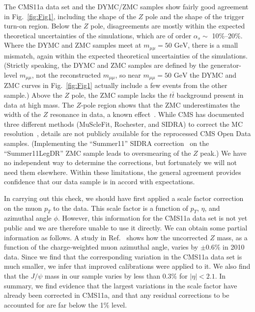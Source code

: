 \documentclass[aps,prd,twocolumn,superscriptaddress,preprintnumbers,nofootinbib,longbibliography,floatfix]{revtex4-1}
\newcommand{\GeV}{\text{~GeV}}
\DeclareRobustCommand{\Fig}[1]{Fig.~\ref{#1}}
\DeclareRobustCommand{\Ref}[1]{Ref.~\cite{#1}}
\begin{document}
The CMS11a data set and the DYMC/ZMC samples show fairly good agreement in \Fig{fig:Fig1}, including the shape of the $Z$ pole and the shape of the trigger turn-on region.
%
Below the $Z$ pole, disagreements are mostly within the expected theoretical uncertainties of the simulations, which are of order $\alpha_s\sim$ 10\%--20\%.
%
Where the DYMC and ZMC samples meet at $m_{\mu\mu} = 50 \GeV$, there is a small mismatch, again within the expected theoretical uncertainties of the simulations.
%
(Strictly speaking, the DYMC and ZMC samples are defined by the generator-level $m_{\mu\mu}$, not the reconstructed $m_{\mu\mu}$, so near $m_{\mu\mu} = 50 \GeV$ the DYMC and ZMC curves in \Fig{fig:Fig1} actually include a few events from the other sample.)
%
Above the $Z$ pole, the ZMC sample lacks the $t\bar t$ background present in data at high mass.
%
The $Z$-pole region shows that the ZMC underestimates the width of the $Z$ resonance in data, a known effect~\cite{Chatrchyan:2012xi}.
%
While CMS has documented three different methods (MuScleFit, Rochester, and SIDRA) to correct the MC resolution~\cite{CERNOpenDataMuonRecommendations}, details are not publicly available for the reprocessed CMS Open Data samples.
%
(Implementing the ``Summer11'' SIDRA correction~\cite{CMSSIDRA} on the ``Summer11LegDR'' ZMC sample leads to oversmearing of the $Z$ peak.)
%
We have no independent way to determine the corrections, but fortunately we will not need them elsewhere.
%
Within these limitations, the general agreement provides confidence that our data sample is in accord with expectations.



In carrying out this check, we should have first applied a scale factor correction on the muon $p_T$ to the data.
%
This scale factor is a function of $p_T$, $\eta$, and azimuthal angle $\phi$.  
%
However, this information for the CMS11a data set is not yet public and we are therefore unable to use it directly.
%
We can obtain some partial information as follows.
%
A study in \Ref{Chatrchyan:2012xi} shows how the uncorrected $Z$ mass, as a function of the charge-weighted muon azimuthal angle, varies by $\pm 0.6\%$ in 2010 data.  
%
Since we find that the corresponding variation in the CMS11a data set is much smaller, we infer that improved calibrations were applied to it.
%
We also find that the $J/\psi$ mass in our sample varies by less than $0.3\%$ for $|\eta|<2.1$.
%
In summary, we find evidence that the largest variations in the scale factor have already been corrected in CMS11a, and that any residual corrections to be accounted for are far below the 1\% level.
\end{document}

